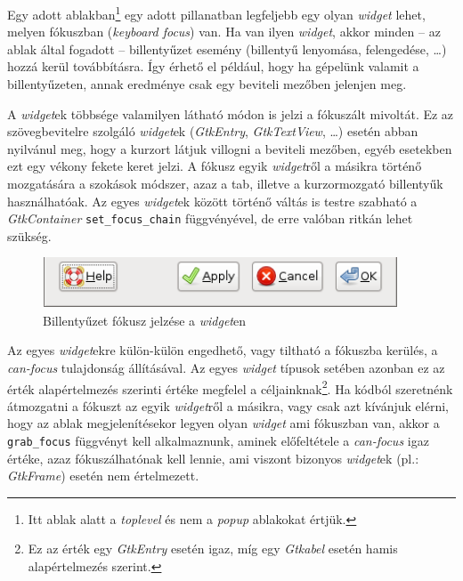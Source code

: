 Egy adott ablakban\footnote{Itt ablak alatt a \textit{toplevel} és nem a \textit{popup} ablakokat értjük.} egy adott pillanatban legfeljebb egy olyan \textit{widget} lehet, melyen fókuszban (\textit{keyboard focus}) van. Ha van ilyen \textit{widget}, akkor minden -- az ablak által fogadott -- billentyűzet esemény (billentyű lenyomása, felengedése, \dots) hozzá kerül továbbításra. Így érhető el például, hogy ha gépelünk valamit a billentyűzeten, annak eredménye csak egy beviteli mezőben jelenjen meg.

A \textit{widget}ek többsége valamilyen látható módon is jelzi a fókuszált mivoltát. Ez az szövegbevitelre szolgáló \textit{widget}ek (\textit{GtkEntry}, \textit{GtkTextView}, \dots) esetén abban nyilvánul meg, hogy a kurzort látjuk villogni a beviteli mezőben, egyéb esetekben ezt egy vékony fekete keret jelzi. A fókusz egyik \textit{widget}ről a másikra történő mozgatására a szokások módszer, azaz a tab, illetve a kurzormozgató billentyűk használhatóak. Az egyes \textit{widget}ek között történő váltás is testre szabható a \textit{GtkContainer} \texttt{set\_focus\_chain} függvényével, de erre valóban ritkán lehet szükség.

\begin{figure}[H]
\begin{center}
\includegraphics[height=15mm]{images/widget-keyboard-focus.png}
\caption{Billentyűzet fókusz jelzése a \textit{widget}en}
\end{center}
\end{figure}

Az egyes \textit{widget}ekre külön-külön engedhető, vagy tiltható a fókuszba kerülés, a \textit{can-focus} tulajdonság állításával. Az egyes \textit{widget} típusok setében azonban ez az érték alapértelmezés szerinti értéke megfelel a céljainknak\footnote{Ez az érték egy \textit{GtkEntry} esetén igaz, míg egy \textit{Gtkabel} esetén hamis alapértelmezés szerint.}. Ha kódból szeretnénk átmozgatni a fókuszt az egyik \textit{widget}ről a másikra, vagy csak azt kívánjuk elérni, hogy az ablak megjelenítésekor legyen olyan \textit{widget} ami fókuszban van, akkor a \texttt{grab\_focus} függvényt kell alkalmaznunk, aminek előfeltétele a \textit{can-focus} igaz értéke, azaz fókuszálhatónak kell lennie, ami viszont bizonyos \textit{widget}ek (pl.: \textit{GtkFrame}) esetén nem értelmezett.

